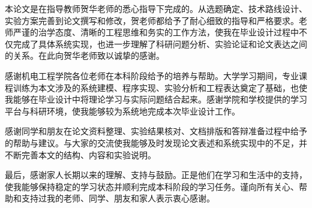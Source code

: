 本论文是在指导教师贺华老师的悉心指导下完成的。从选题确定、技术路线设计、实验方案完善到论文撰写和修改，贺老师都给予了耐心细致的指导和严格要求。老师严谨的治学态度、清晰的工程思维和务实的工作方法，使我在毕业设计过程中不仅完成了具体系统实现，也进一步理解了科研问题分析、实验论证和论文表达之间的关系。在此向贺华老师致以诚挚的感谢。

感谢机电工程学院各位老师在本科阶段给予的培养与帮助。大学学习期间，专业课程训练为本文涉及的系统建模、程序实现、实验分析和工程表达奠定了基础，也使我能够在毕业设计中将理论学习与实际问题结合起来。感谢学院和学校提供的学习平台与科研环境，使我能够较为系统地完成本次毕业设计工作。

感谢同学和朋友在论文资料整理、实验结果核对、文档排版和答辩准备过程中给予的帮助与建议。与大家的交流使我能够及时发现论文表述和系统实现中的不足，并不断完善本文的结构、内容和实验说明。

最后，感谢家人长期以来的理解、支持与鼓励。正是他们在学习和生活中的支持，使我能够保持稳定的学习状态并顺利完成本科阶段的学习任务。谨向所有关心、帮助和支持过我的老师、同学、朋友和家人表示衷心感谢。
